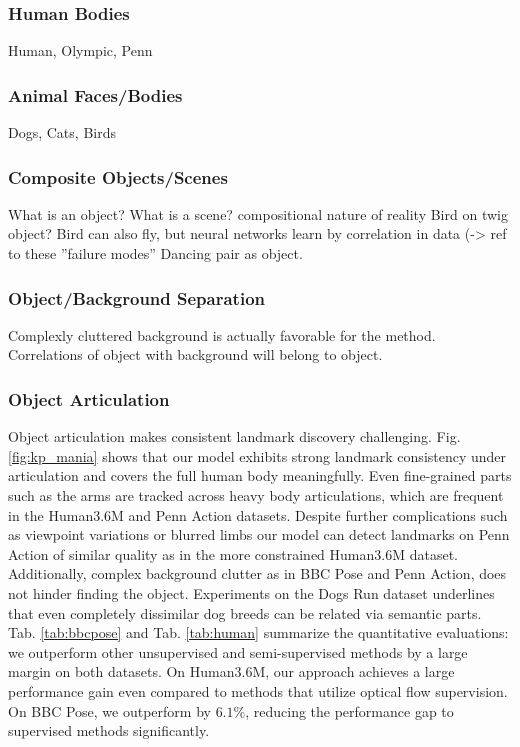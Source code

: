 		\subsubsection{Human Bodies}
		Human, Olympic, Penn
		\subsubsection{Animal Faces/Bodies}
		Dogs, Cats, Birds
		\subsubsection{Composite Objects/Scenes}
		What is an object? What is a scene?
		compositional nature of reality
		Bird on twig object? Bird can also fly, but neural networks learn by correlation in data (-> ref to these ''failure modes''
		Dancing pair as object.
		\subsubsection{Object/Background Separation}
			Complexly cluttered background is actually favorable for the method. Correlations of object with background will belong to object.
		\subsubsection{Object Articulation}
			Object articulation makes consistent landmark discovery challenging.
			Fig. \ref{fig:kp_mania} shows that our model exhibits strong landmark consistency under articulation and covers the full human body meaningfully.
			Even fine-grained parts such as the arms are tracked across heavy body articulations, which are frequent in the Human3.6M and Penn Action datasets.
			Despite further complications such as viewpoint variations or blurred limbs our model can detect landmarks on Penn Action of similar quality as in the more constrained Human3.6M dataset.
			Additionally, complex background clutter as in BBC Pose and Penn Action, does not hinder finding the object.
			Experiments on the Dogs Run dataset underlines that even completely dissimilar dog breeds can be related via semantic parts.
			Tab. \ref{tab:bbcpose} and Tab. \ref{tab:human} summarize the quantitative evaluations: we outperform other unsupervised and semi-supervised methods by a large margin on both datasets.
			On Human3.6M, our approach achieves a large performance gain even compared to methods that utilize optical flow supervision.
			On BBC Pose, we outperform \cite{jakab18} by $6.1\%$, reducing the performance gap to supervised methods significantly.
